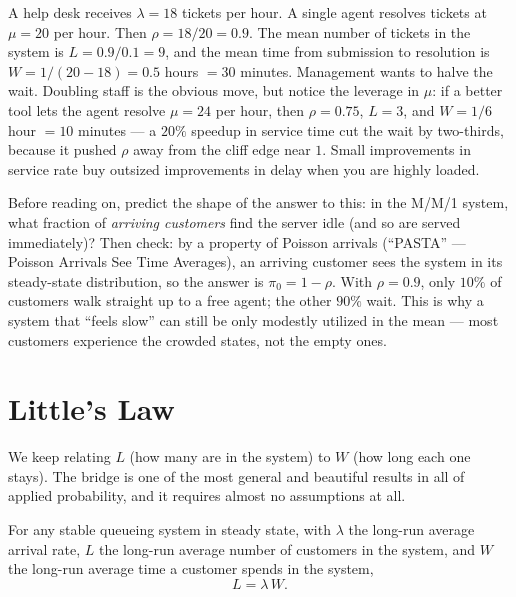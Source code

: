 \begin{example}
\label{ch27:ex-helpdesk}
A help desk receives $\lambda = 18$ tickets per hour. A single agent resolves tickets at
$\mu = 20$ per hour. Then $\rho = 18/20 = 0.9$. The mean number of tickets in the system is
$L = 0.9/0.1 = 9$, and the mean time from submission to resolution is
$W = 1/(20 - 18) = 0.5$ hours $= 30$ minutes. Management wants to halve the wait. Doubling staff is
the obvious move, but notice the leverage in $\mu$: if a better tool lets the agent resolve
$\mu = 24$ per hour, then $\rho = 0.75$, $L = 3$, and $W = 1/6$ hour $= 10$ minutes --- a $20\%$
speedup in service time cut the wait by two-thirds, because it pushed $\rho$ away from the cliff edge
near $1$. Small improvements in service rate buy outsized improvements in delay when you are highly
loaded.
\end{example}

\begin{labbox}
Before reading on, predict the shape of the answer to this: in the M/M/1 system, what fraction of
\emph{arriving customers} find the server idle (and so are served immediately)? Then check: by a
property of Poisson arrivals (``PASTA'' --- Poisson Arrivals See Time Averages), an arriving customer
sees the system in its steady-state distribution, so the answer is $\pi_0 = 1 - \rho$. With
$\rho = 0.9$, only $10\%$ of customers walk straight up to a free agent; the other $90\%$ wait. This
is why a system that ``feels slow'' can still be only modestly utilized in the mean --- most
customers experience the crowded states, not the empty ones.
\end{labbox}

\section{Little's Law}
\label{ch27:little}

We keep relating $L$ (how many are in the system) to $W$ (how long each one stays). The bridge is one
of the most general and beautiful results in all of applied probability, and it requires almost no
assumptions at all.

\begin{theorem}
\label{ch27:thm-little}
For any stable queueing system in steady state, with $\lambda$ the long-run average arrival rate,
$L$ the long-run average number of customers in the system, and $W$ the long-run average time a
customer spends in the system,
\[
  \boxed{\,L = \lambda\, W.\,}
\]
\end{theorem}

